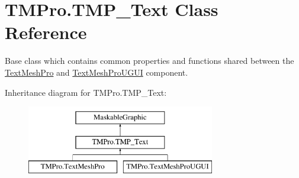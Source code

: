 \hypertarget{class_t_m_pro_1_1_t_m_p___text}{}\section{T\+M\+Pro.\+T\+M\+P\+\_\+\+Text Class Reference}
\label{class_t_m_pro_1_1_t_m_p___text}


Base class which contains common properties and functions shared between the \mbox{\hyperlink{class_t_m_pro_1_1_text_mesh_pro}{Text\+Mesh\+Pro}} and \mbox{\hyperlink{class_t_m_pro_1_1_text_mesh_pro_u_g_u_i}{Text\+Mesh\+Pro\+U\+G\+UI}} component.  


Inheritance diagram for T\+M\+Pro.\+T\+M\+P\+\_\+\+Text\+:\begin{figure}[H]
\begin{center}
\leavevmode
\includegraphics[height=3.000000cm]{class_t_m_pro_1_1_t_m_p___text}
\end{center}
\end{figure}
